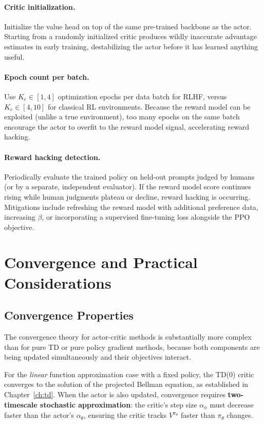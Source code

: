 \paragraph{Critic initialization.}
Initialize the value head on top of the same pre-trained backbone as the
actor.  Starting from a randomly initialized critic produces wildly
inaccurate advantage estimates in early training, destabilizing the actor
before it has learned anything useful.

\paragraph{Epoch count per batch.}
Use $K_e \in [1, 4]$ optimization epochs per data batch for RLHF, versus
$K_e \in [4, 10]$ for classical RL environments.  Because the reward model
can be exploited (unlike a true environment), too many epochs on the same
batch encourage the actor to overfit to the reward model signal,
accelerating reward hacking.

\paragraph{Reward hacking detection.}
Periodically evaluate the trained policy on held-out prompts judged by
humans (or by a separate, independent evaluator).  If the reward model
score continues rising while human judgments plateau or decline, reward
hacking is occurring.  Mitigations include refreshing the reward model with
additional preference data, increasing $\beta$, or incorporating a
supervised fine-tuning loss alongside the PPO objective.

\section{Convergence and Practical Considerations}
\label{sec:ac-convergence}

\subsection{Convergence Properties}

The convergence theory for actor-critic methods is substantially more complex
than for pure TD or pure policy gradient methods, because both components
are being updated simultaneously and their objectives interact.

For the \emph{linear} function approximation case with a fixed policy, the
TD(0) critic converges to the solution of the projected Bellman equation,
as established in Chapter~\ref{ch:td}.  When the actor is also updated,
convergence requires \textbf{two-timescale stochastic approximation}: the
critic's step size $\alpha_\phi$ must decrease faster than the actor's
$\alpha_\theta$, ensuring the critic tracks $V^{\pi_\theta}$ faster than
$\pi_\theta$ changes.

